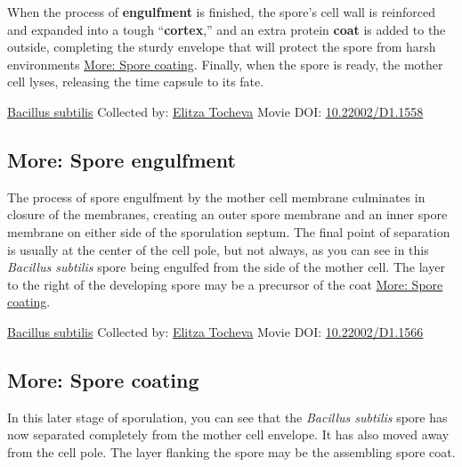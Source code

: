 \documentclass[]{tufte-book}
\begin{document}
When the process of \textbf{engulfment} is finished, the spore's cell wall is reinforced and expanded into a tough ``\textbf{cortex},'' and an extra protein \textbf{coat} is added to the outside, completing the sturdy envelope that will protect the spore from harsh environments \protect\hyperlink{Spore_coating}{More: Spore coating}. Finally, when the spore is ready, the mother cell lyses, releasing the time capsule to its fate.



\hypertarget{htmlwidget-b655ed8b1865d8fc0908}{}

\label{fig:8-6}\protect\hyperlink{tree}{Bacillus subtilis} Collected by: \protect\hyperlink{elitza_tocheva}{Elitza Tocheva} Movie DOI: \href{https://doi.org/10.22002/D1.1558}{10.22002/D1.1558}

\hypertarget{Spore_engulfment}{%
\subsection*{More: Spore engulfment}\label{Spore_engulfment}}

The process of spore engulfment by the mother cell membrane culminates in closure of the membranes, creating an outer spore membrane and an inner spore membrane on either side of the sporulation septum. The final point of separation is usually at the center of the cell pole, but not always, as you can see in this \emph{Bacillus subtilis} spore being engulfed from the side of the mother cell. The layer to the right of the developing spore may be a precursor of the coat \protect\hyperlink{Spore_coating}{More: Spore coating}.



\hypertarget{htmlwidget-782fec1715798b58b14a}{}

\label{fig:8-6a}\protect\hyperlink{tree}{Bacillus subtilis} Collected by: \protect\hyperlink{elitza_tocheva}{Elitza Tocheva} Movie DOI: \href{https://doi.org/10.22002/D1.1566}{10.22002/D1.1566}

\hypertarget{Spore_coating}{%
\subsection*{More: Spore coating}\label{Spore_coating}}

In this later stage of sporulation, you can see that the \emph{Bacillus subtilis} spore has now separated completely from the mother cell envelope. It has also moved away from the cell pole. The layer flanking the spore may be the assembling spore coat.
\end{document}
